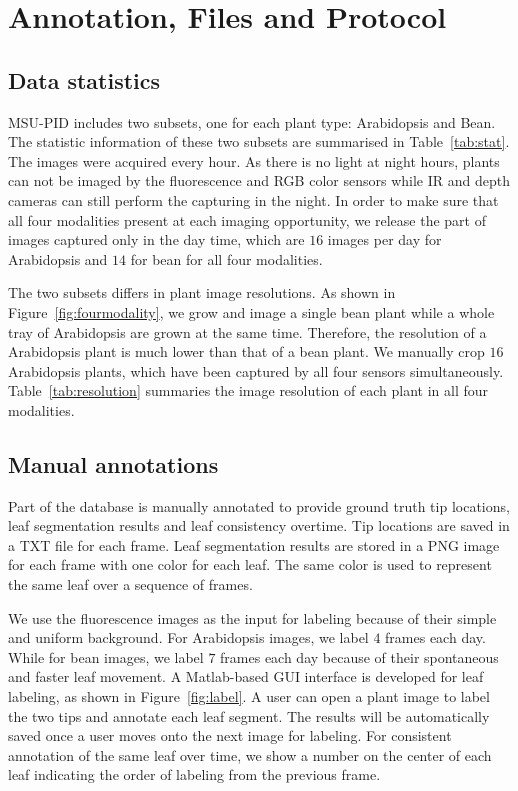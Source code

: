 \section{Annotation, Files and Protocol}
\subsection{Data statistics}
MSU-PID includes two subsets, one for each plant type: Arabidopsis and Bean.
The statistic information of these two subsets are summarised in Table~\ref{tab:stat}.
The images were acquired every hour.
As there is no light at night hours, plants can not be imaged by the fluorescence and RGB color sensors while IR and depth cameras can still perform the capturing in the night.
In order to make sure that all four modalities present at each imaging opportunity, we release the part of images captured only in the day time, which are $16$ images per day for Arabidopsis and $14$ for bean for all four modalities.



The two subsets differs in plant image resolutions.
As shown in Figure~\ref{fig:fourmodality},  we grow and image a single bean plant while a whole tray of Arabidopsis are grown at the same time.
Therefore, the resolution of a Arabidopsis plant is much lower than that of a bean plant.
We manually crop $16$ Arabidopsis plants, which have been captured by all four sensors simultaneously.
Table~\ref{tab:resolution} summaries the image resolution of each plant in all four modalities.



\subsection{Manual annotations}
Part of the database is manually annotated to provide ground truth tip locations, leaf segmentation results and leaf consistency overtime.
Tip locations are saved in a TXT file for each frame.
Leaf segmentation results are stored in a PNG image for each frame with one color for each leaf.
The same color is used to represent the same leaf over a sequence of frames.

We use the fluorescence images as the input for labeling because of their simple and uniform background.
For Arabidopsis images, we label $4$ frames each day.
While for bean images, we label $7$ frames each day because of their spontaneous and faster leaf movement.
A Matlab-based GUI interface is developed for leaf labeling, as shown in Figure~\ref{fig:label}.
A user can open a plant image to label the two tips and annotate each leaf segment.
The results will be automatically saved once a user moves onto the next image for labeling.
For consistent annotation of the same leaf over time, we show a number on the center of each leaf indicating the order of labeling from the previous frame.

